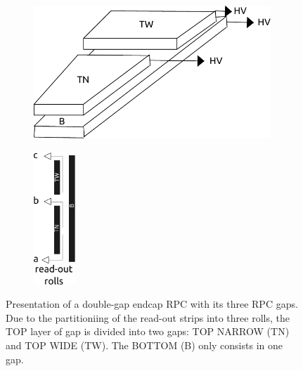	\begin{figure}[H]
    	\begin{subfigure}{0.69\linewidth}
			\centering
    		\includegraphics[height = 5cm]{fig/chapt5/Endcap-3D.pdf}
        	\caption{\label{fig:EndcapRPC:A}}
    	\end{subfigure}
    	\begin{subfigure}{0.29\linewidth}
			\centering
    		\includegraphics[height = 5cm]{fig/chapt5/Endcap-side.pdf}\\
        	\caption{\label{fig:EndcapRPC:B}}
    	\end{subfigure}
		\caption{\label{fig:EndcapRPC} Presentation of a double-gap endcap RPC with its three RPC gaps. Due to the partitioniing of the read-out strips into three rolls, the TOP layer of gap is divided into two gaps: TOP NARROW (TN) and TOP WIDE (TW). The BOTTOM (B) only consists in one gap.}
	\end{figure}
	
